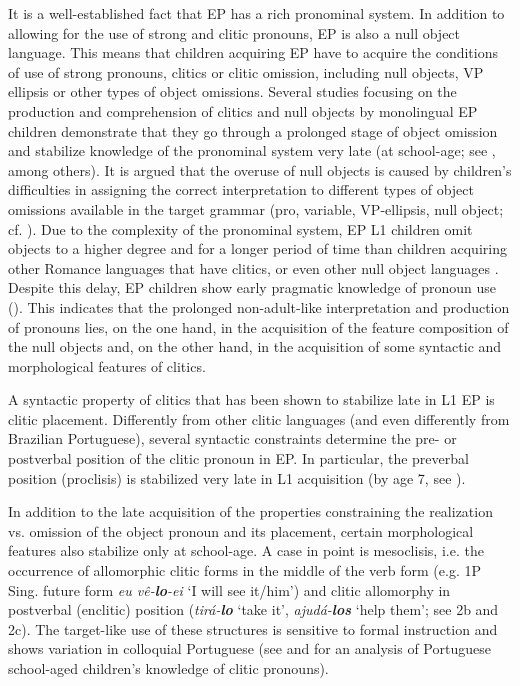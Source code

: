 \documentclass[output=paper]{langscibook}
\begin{document}
It is a well-established fact that EP has a rich pronominal system. In addition to allowing for the use of strong and clitic pronouns, EP is also a null object language. This means that children acquiring EP have to acquire the conditions of use of strong pronouns, clitics or clitic omission, including null objects, VP ellipsis or other types of object omissions. Several studies focusing on the production and comprehension of clitics and null objects by monolingual EP children demonstrate that they go through a prolonged stage of object omission and stabilize knowledge of the pronominal system very late (at school-age; see \citealt{CostaLobo2007,CostaLobo2009, CostaSilvaEtAl2009, CostaEtAl2012, FloresSopata2020}, among others). It is argued that the overuse of null objects is caused by children’s difficulties in assigning the correct interpretation to different types of object omissions available in the target grammar (pro, variable, VP-ellipsis, null object; cf. \citealt{CostaEtAl2012}). Due to the complexity of the pronominal system, EP L1 children omit objects to a higher degree and for a longer period of time than children acquiring other Romance languages that have clitics, or even other null object languages \citep{Varlokosta2016}. Despite this delay, EP children show early pragmatic knowledge of pronoun use (\citealt{CostaSilvaEtAl2009, FloresSopata2020}). This indicates that the prolonged non-adult-like interpretation and production of pronouns lies, on the one hand, in the acquisition of the feature composition of the null objects and, on the other hand, in the acquisition of some syntactic and morphological features of clitics.

A syntactic property of clitics that has been shown to stabilize late in L1 EP is clitic placement. Differently from other clitic languages (and even differently from Brazilian Portuguese), several syntactic constraints determine the pre- or postverbal position of the clitic pronoun in EP. In particular, the preverbal position (proclisis) is stabilized very late in L1 acquisition (by age 7, see \citealt{CostaLobo2015}).

In addition to the late acquisition of the properties constraining the realization vs. omission of the object pronoun and its placement, certain morphological features also stabilize only at school-age. A case in point is mesoclisis, i.e. the occurrence of allomorphic clitic forms in the middle of the verb form (e.g. 1P Sing. future form \textit{eu vê-}\textbf{\textit{lo}}\textit{{}-ei} ‘I will see it\slash him’) and clitic allomorphy in postverbal (enclitic) position (\textit{tirá-}\textbf{\textit{lo}} ‘take it’, \textit{ajudá-}\textbf{\textit{los}} ‘help them’; see 2b and 2c). The target-like use of these structures is sensitive to formal instruction and shows variation in colloquial Portuguese (see \citealt{Catalão2011, Santos2002} and \citealt{Batalha2018} for an analysis of Portuguese school-aged children’s knowledge of clitic pronouns).
\end{document}
